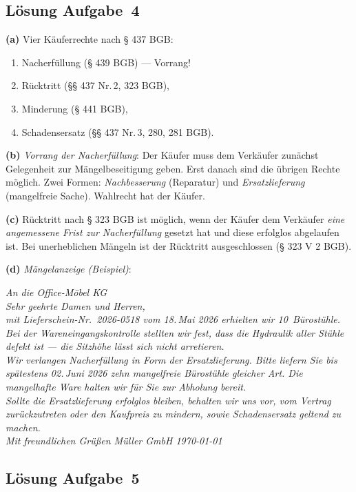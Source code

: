 \documentclass[11pt, a4paper]{article}
\begin{document}
\subsection*{Lösung Aufgabe~4}

\begin{loesung}
\textbf{(a)} Vier Käuferrechte nach § 437 BGB:
\begin{enumerate}[itemsep=0pt]
  \item Nacherfüllung (§ 439 BGB) --- Vorrang!
  \item Rücktritt (§§ 437 Nr.\,2, 323 BGB),
  \item Minderung (§ 441 BGB),
  \item Schadensersatz (§§ 437 Nr.\,3, 280, 281 BGB).
\end{enumerate}

\textbf{(b)} \emph{Vorrang der Nacherfüllung}: Der Käufer muss dem Verkäufer zunächst
Gelegenheit zur Mängelbeseitigung geben. Erst danach sind die übrigen Rechte möglich.
Zwei Formen: \emph{Nachbesserung} (Reparatur) und \emph{Ersatzlieferung} (mangelfreie Sache).
Wahlrecht hat der Käufer.

\textbf{(c)} Rücktritt nach § 323 BGB ist möglich, wenn der Käufer dem Verkäufer
\emph{eine angemessene Frist zur Nacherfüllung} gesetzt hat und diese erfolglos
abgelaufen ist. Bei unerheblichen Mängeln ist der Rücktritt ausgeschlossen
(§ 323 V 2 BGB).

\textbf{(d)} \emph{Mängelanzeige (Beispiel)}:

\medskip
\textit{An die Office-Möbel KG\\
Sehr geehrte Damen und Herren,\\
mit Lieferschein-Nr.\ 2026-0518 vom 18.\,Mai 2026 erhielten wir 10~Bürostühle. Bei der
Wareneingangskontrolle stellten wir fest, dass die Hydraulik aller Stühle defekt ist
--- die Sitzhöhe lässt sich nicht arretieren.\\
Wir verlangen Nacherfüllung in Form der \emph{Ersatzlieferung}. Bitte liefern Sie bis
spätestens 02.\,Juni 2026 zehn mangelfreie Bürostühle gleicher Art. Die mangelhafte
Ware halten wir für Sie zur Abholung bereit.\\
Sollte die Ersatzlieferung erfolglos bleiben, behalten wir uns vor, vom Vertrag
zurückzutreten oder den Kaufpreis zu mindern, sowie Schadensersatz geltend zu machen.\\
Mit freundlichen Grüßen \textbar{} Müller GmbH \textbar{} \today}
\end{loesung}

\subsection*{Lösung Aufgabe~5}
\end{document}
